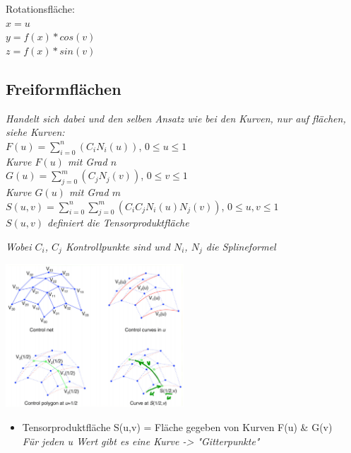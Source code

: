 Rotationsfläche:\\
\textit{$x=u$}\\
\textit{$y = f(x) * cos(v)$}\\
\textit{$z = f(x) * sin(v)$}\\

\subsection{Freiformflächen}

\textit{Handelt sich dabei und den selben Ansatz wie bei den Kurven,
nur auf flächen, siehe Kurven:}\\

$F(u) = \displaystyle \sum^n_{i=0}(C_i N_i (u))$, $0 \leq u \leq 1$\\
\textit{Kurve $F(u)$ mit Grad $n$}\\
$G(u) = \displaystyle \sum^m_{j=0}(C_j N_j (v))$, $0 \leq v \leq 1$\\
\textit{Kurve $G(u)$ mit Grad $m$}\\

$S(u,v) = \displaystyle \sum^n_{i=0}\sum^m_{j=0}(C_iC_jN_i(u)N_j(v))$, $0 \leq u, v \leq 1$\\
\textit{$S(u,v)$ definiert die Tensorproduktfläche}

\textit{Wobei $C_i$, $C_j$ Kontrollpunkte sind und $N_i$, $N_j$ die Splineformel}

\includegraphics[width=0.5\textwidth]{assets/area-splines.png}

\begin{itemize}
	\item Tensorproduktfläche S(u,v) = Fläche gegeben von Kurven F(u) \& G(v) \\
	\textit{Für jeden u Wert gibt es eine Kurve -> "Gitterpunkte"}
\end{itemize}